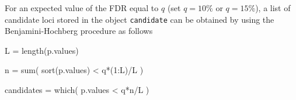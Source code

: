 \documentclass[10pt,a4paper]{article}
\begin{document}
                        
                        
\noindent For an expected value of the FDR equal to $q$  (set $q= 10 \%$ or $q = 15 \%$), a list of candidate loci stored in the object {\tt candidate} can be obtained by using the Benjamini-Hochberg procedure as follows
 {\tt

  L = length(p.values) 
  
  n = sum( sort(p.values) < q*(1:L)/L )
  
  candidates = which( p.values < q*n/L )

}

%
%
%
%
\end{document}
